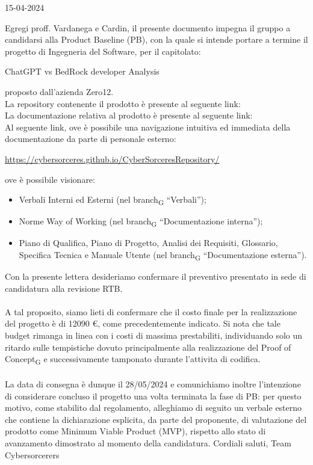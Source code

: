 \documentclass{article}
\begin{document}
\newpage

\begin{flushright}
15-04-2024
\end{flushright}
Egregi proff. Vardanega e Cardin,
\newline
il presente documento impegna il gruppo a candidarsi alla Product Baseline (PB), con la quale si intende portare a termine il progetto di Ingegneria del Software, per il
capitolato:
\newline
\begin{center}
    ChatGPT vs BedRock developer Analysis
\end{center}
proposto dall’azienda Zero12. \\
La repository contenente il prodotto è presente al seguente link:\\

La documentazione relativa al prodotto è presente al seguente link:\\

Al seguente link, ove è possibile una navigazione intuitiva ed immediata della documentazione da parte di personale esterno:
\begin{center}
    \href{https://cybersorceres.github.io/CyberSorceresRepository/}{https://cybersorceres.github.io/CyberSorceresRepository/}
\end{center}
ove è possibile visionare:
\begin{itemize}
    \item Verbali Interni ed Esterni (nel branch\textsubscript{G} “Verbali”);
    \item Norme Way of Working (nel branch\textsubscript{G} “Documentazione interna”);
    \item Piano di Qualifica, Piano di Progetto, Analisi dei Requisiti, Glossario, Specifica Tecnica e Manuale Utente (nel branch\textsubscript{G} “Documentazione esterna”).
\end{itemize}

Con la presente lettera desideriamo confermare il preventivo presentato in sede di candidatura alla revisione RTB.\\ \\
A tal proposito, siamo lieti di confermare che il costo finale per la realizzazione del progetto è di 12090 €, come precedentemente indicato. Si nota che tale budget rimanga in linea con i costi di massima prestabiliti, individuando solo un ritardo sulle tempistiche dovuto principalmente alla realizzazione del Proof of Concept\textsubscript{G} e successivamente tamponato durante l'attivita di codifica. \\ \\
La data di consegna è dunque il 28/05/2024 e comunichiamo inoltre l’intenzione di considerare concluso il progetto una volta terminata la fase di PB: per questo motivo, come stabilito dal regolamento, alleghiamo di seguito un verbale esterno che contiene la dichiarazione esplicita, da parte del proponente, di valutazione del prodotto come Minimum Viable Product (MVP), rispetto allo stato di avanzamento dimostrato al momento della candidatura. 
\newline
\newline
Cordiali saluti,
\newline
Team Cybersorcerers
\end{document}
